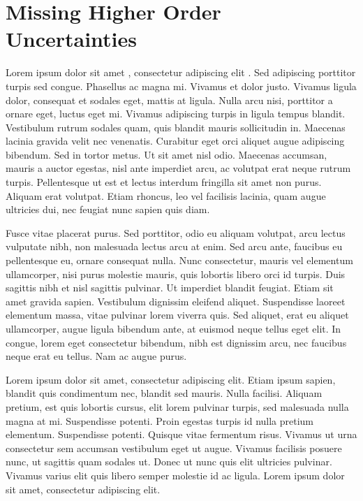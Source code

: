 \chapter{Missing Higher Order Uncertainties}

Lorem ipsum dolor sit amet \cite{abramowitz+stegun}, consectetur adipiscing elit . Sed adipiscing porttitor turpis sed congue. Phasellus ac magna mi. Vivamus et dolor justo. Vivamus ligula dolor, consequat et sodales eget, mattis at ligula. Nulla arcu nisi, porttitor a ornare eget, luctus eget mi. Vivamus adipiscing turpis in ligula tempus blandit. Vestibulum rutrum sodales quam, quis blandit mauris sollicitudin in. Maecenas lacinia gravida velit nec venenatis. Curabitur eget orci aliquet augue adipiscing bibendum. Sed in tortor metus. Ut sit amet nisl odio. Maecenas accumsan, mauris a auctor egestas, nisl ante imperdiet arcu, ac volutpat erat neque rutrum turpis. Pellentesque ut est et lectus interdum fringilla sit amet non purus. Aliquam erat volutpat. Etiam rhoncus, leo vel facilisis lacinia, quam augue ultricies dui, nec feugiat nunc sapien quis diam.

Fusce vitae placerat purus. Sed porttitor, odio eu aliquam volutpat, arcu lectus vulputate nibh, non malesuada lectus arcu at enim. Sed arcu ante, faucibus eu pellentesque eu, ornare consequat nulla. Nunc consectetur, mauris vel elementum ullamcorper, nisi purus molestie mauris, quis lobortis libero orci id turpis. Duis sagittis nibh et nisl sagittis pulvinar. Ut imperdiet blandit feugiat. Etiam sit amet gravida sapien. Vestibulum dignissim eleifend aliquet. Suspendisse laoreet elementum massa, vitae pulvinar lorem viverra quis. Sed aliquet, erat eu aliquet ullamcorper, augue ligula bibendum ante, at euismod neque tellus eget elit. In congue, lorem eget consectetur bibendum, nibh est dignissim arcu, nec faucibus neque erat eu tellus. Nam ac augue purus.

Lorem ipsum dolor sit amet, consectetur adipiscing elit. Etiam ipsum sapien, blandit quis condimentum nec, blandit sed mauris. Nulla facilisi. Aliquam pretium, est quis lobortis cursus, elit lorem pulvinar turpis, sed malesuada nulla magna at mi. Suspendisse potenti. Proin egestas turpis id nulla pretium elementum. Suspendisse potenti. Quisque vitae fermentum risus. Vivamus ut urna consectetur sem accumsan vestibulum eget ut augue. Vivamus facilisis posuere nunc, ut sagittis quam sodales ut. Donec ut nunc quis elit ultricies pulvinar. Vivamus varius elit quis libero semper molestie id ac ligula. Lorem ipsum dolor sit amet, consectetur adipiscing elit.


